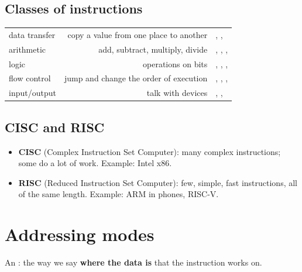 \subsection{Classes of instructions}
\begin{center}
\begin{tabularx}{\linewidth}{|>{\centering\arraybackslash}p{3.5cm}|R|>{\centering\arraybackslash}p{4.2cm}|}
    \hline
     &  &  \\ \hline
    data transfer & copy a value from one place to another & , ,  \\ \hline
    arithmetic & add, subtract, multiply, divide & , , ,  \\ \hline
    logic & operations on bits & , , ,  \\ \hline
    flow control & jump and change the order of execution & , , ,  \\ \hline
    input/output & talk with devices & , ,  \\ \hline
\end{tabularx}
\end{center}

\subsection{CISC and RISC}
\begin{itemize}
    \item \textbf{CISC} (Complex Instruction Set Computer): many complex instructions; some do a lot of work. Example: Intel x86.
    \item \textbf{RISC} (Reduced Instruction Set Computer): few, simple, fast instructions, all of the same length.
          Example: ARM in phones, RISC-V.
\end{itemize}

\section{Addressing modes}

\begin{tarif}
    An : the way we say \textbf{where the data is} that the instruction works on.
\end{tarif}

